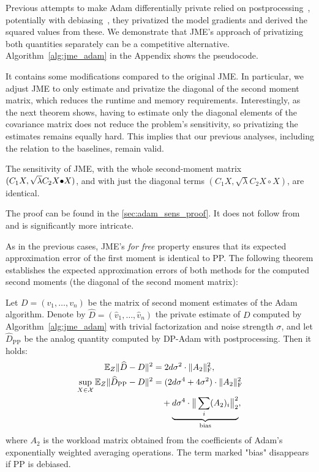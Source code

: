 Previous attempts to make Adam differentially private relied on postprocessing~\citep{anil2021large,  li2022large}, potentially with debiasing~\citep{dp_adam_is_not_adam}, \ie 
they privatized the model gradients and derived the squared values from these.
%
We demonstrate that JME's approach of privatizing both 
quantities separately can be a competitive alternative.
%
Algorithm~\ref{alg:jme_adam} in the Appendix shows the pseudocode. 
%

It contains some modifications compared to the original JME. 
%
In particular, we adjust JME to only estimate and privatize the diagonal of 
the second moment matrix, which reduces the runtime and memory requirements.
%
Interestingly, as the next theorem shows, having to estimate only the diagonal
elements of the covariance matrix does not reduce the problem's sensitivity, 
so privatizing the estimates remains equally hard.
%
This implies that our previous analyses, including the relation to the baselines, 
remain valid. 

\begin{theorem}\label{thm:Adam_sens}
The sensitivity of JME, with the whole second-moment matrix $(C_1 X, \sqrt{\lambda} C_2 X \operatorname{\!\bullet\!} X)$, and with just the diagonal terms $(C_1 X, \sqrt{\lambda} C_2 X\!\circ\!X)$, are identical.
\end{theorem}

The proof can be found in the \cref{sec:adam_sens_proof}. It does not follow from  and is significantly more intricate. 


As in the previous cases, JME's \emph{for free} property ensures that its 
expected approximation error of the first moment is identical to PP.
%
The following theorem establishes the expected approximation errors of 
both methods for the computed second moments (\ie the diagonal of the second moment matrix):

\begin{lemma}
\label{lem:Comparison_Errors}
%
Let $D=(v_1,\dots,v_n)$ be the matrix of second moment estimates of the Adam algorithm.
Denote by $\widehat D=(\widehat v_1,\dots,\widehat v_n)$ the private estimate of $D$ computed by Algorithm~\ref{alg:jme_adam} with trivial factorization and noise strength $\sigma$, 
and let $\widehat D_{\text{PP}}$ be the analog quantity computed by DP-Adam with postprocessing.
%
Then it holds: %
\begin{align}
\mathbb{E}_{Z} \|\widehat D-D\|^2 &= 2d \sigma^2 \cdot \| A_2 \|_{\Fr}^2,\\
\sup_{X \in \mathcal{X}}\mathbb{E}_{Z} \|\widehat D_{\text{PP}}-D\|^2 
&= (2d \sigma^4 + 4 \sigma^2) \cdot \| A_2 \|_{\Fr}^2 %
\notag\\
&\quad+ \underbrace{d \sigma^4 \cdot \big\| \sum_{i} (A_2)_i \big\|_2^2}_{\text{bias}},
\end{align}
where $A_2$ is the workload matrix obtained from the coefficients 
of Adam's exponentially weighted averaging operations.
%
The term marked "bias" disappears if PP is debiased.
\end{lemma}

